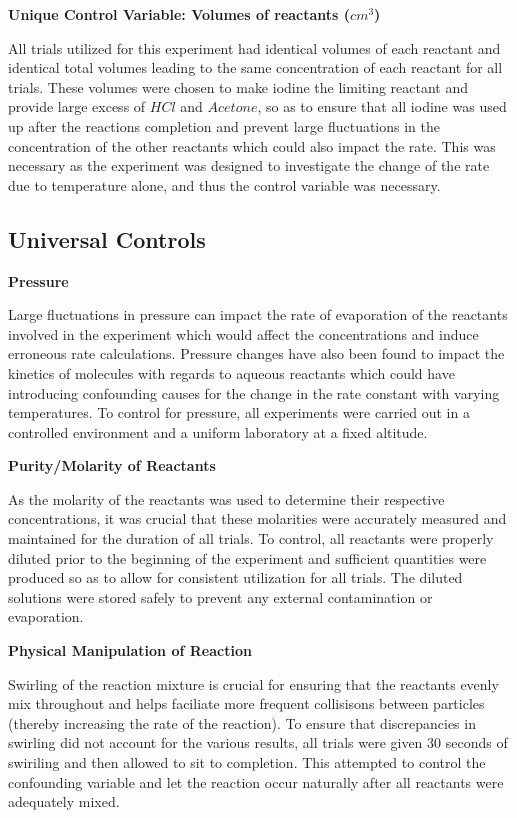 \textbf{Unique Control Variable: Volumes of reactants ($cm^3$)} 

All trials utilized for this experiment had identical volumes of each reactant and identical total volumes leading to the same concentration of each reactant for all trials. These volumes were chosen to make iodine the limiting reactant and provide large excess of $HCl$ and $Acetone$, so as to ensure that all iodine was used up after the reactions completion and prevent large fluctuations in the concentration of the other reactants which could also impact the rate. This was necessary as the experiment was designed to investigate the change of the rate due to temperature alone, and thus the control variable was necessary.

\subsection{Universal Controls}

\textbf{Pressure}

Large fluctuations in pressure can impact the rate of evaporation of the reactants involved in the experiment which would affect the concentrations and induce erroneous rate calculations. Pressure changes have also been found to impact the kinetics of molecules with regards to aqueous reactants which could have introducing confounding causes for the change in the rate constant with varying temperatures. To control for pressure, all experiments were carried out in a controlled environment and a uniform laboratory at a fixed altitude. 

\textbf{Purity/Molarity of Reactants}

As the molarity of the reactants was used to determine their respective concentrations, it was crucial that these molarities were accurately measured and maintained for the duration of all trials. To control, all reactants were properly diluted prior to the beginning of the experiment and sufficient quantities were produced so as to allow for consistent utilization for all trials. The diluted solutions were stored safely to prevent any external contamination or evaporation.

\textbf{Physical Manipulation of Reaction}

Swirling of the reaction mixture is crucial for ensuring that the reactants evenly mix throughout and helps faciliate more frequent collisisons between particles (thereby increasing the rate of the reaction). To ensure that discrepancies in swirling did not account for the various results, all trials were given $30$ seconds of swiriling and then allowed to sit to completion. This attempted to control the confounding variable and let the reaction occur naturally after all reactants were adequately mixed.
